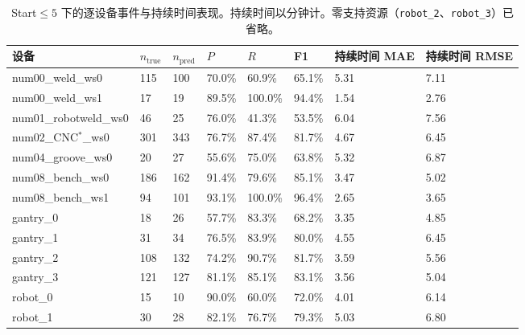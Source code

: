 \begin{table}[t]
\centering
\scriptsize
\setlength{\tabcolsep}{3pt}
\renewcommand{\arraystretch}{1.12}
\caption{Start$\leq5$ 下的逐设备事件与持续时间表现。持续时间以分钟计。零支持资源（\texttt{robot\_2}、\texttt{robot\_3}）已省略。}
\label{tab:complete-6-1}
\begin{tabularx}{\textwidth}{@{}lXXXXXXX@{}}
\toprule
设备 & $n_{\mathrm{true}}$ & $n_{\mathrm{pred}}$ & $P$ & $R$ & F1 & 持续时间 MAE & 持续时间 RMSE \\
\midrule
num00\_weld\_ws0 & 115 & 100 & 70.0\% & 60.9\% & 65.1\% & 5.31 & 7.11 \\
num00\_weld\_ws1 & 17 & 19 & 89.5\% & 100.0\% & 94.4\% & 1.54 & 2.76 \\
num01\_robotweld\_ws0 & 46 & 25 & 76.0\% & 41.3\% & 53.5\% & 6.04 & 7.56 \\
num02\_CNC$^\ast$\_ws0 & 301 & 343 & 76.7\% & 87.4\% & 81.7\% & 4.67 & 6.45 \\
num04\_groove\_ws0 & 20 & 27 & 55.6\% & 75.0\% & 63.8\% & 5.32 & 6.87 \\
num08\_bench\_ws0 & 186 & 162 & 91.4\% & 79.6\% & 85.1\% & 3.47 & 5.02 \\
num08\_bench\_ws1 & 94 & 101 & 93.1\% & 100.0\% & 96.4\% & 2.65 & 3.65 \\
gantry\_0 & 18 & 26 & 57.7\% & 83.3\% & 68.2\% & 3.35 & 4.85 \\
gantry\_1 & 31 & 34 & 76.5\% & 83.9\% & 80.0\% & 4.55 & 6.45 \\
gantry\_2 & 108 & 132 & 74.2\% & 90.7\% & 81.7\% & 3.59 & 5.56 \\
gantry\_3 & 121 & 127 & 81.1\% & 85.1\% & 83.1\% & 3.56 & 5.04 \\
robot\_0 & 15 & 10 & 90.0\% & 60.0\% & 72.0\% & 4.01 & 6.14 \\
robot\_1 & 30 & 28 & 82.1\% & 76.7\% & 79.3\% & 5.03 & 6.80 \\
\bottomrule
\end{tabularx}
\end{table}
